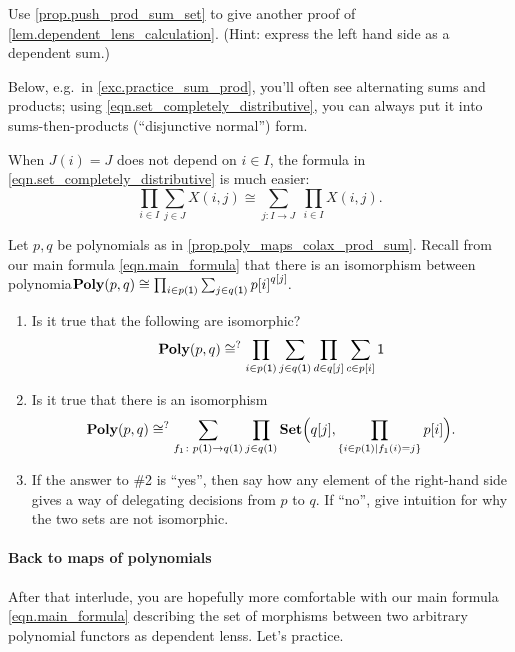 \documentclass[DynamicalBook]{subfiles}
\begin{document}
\begin{exercise}\label{ex.dependent_lens_calculation}
  Use \cref{prop.push_prod_sum_set} to give another proof of
  \cref{lem.dependent_lens_calculation}. (Hint: express the left hand side as a
  dependent sum.)
\end{exercise}

Below, e.g.\ in \cref{exc.practice_sum_prod}, you'll often see alternating sums and products; using \cref{eqn.set_completely_distributive}, you can always put it into sums-then-products (``disjunctive normal'') form.

When $J(i)=J$ does not depend on $i\in I$, the formula in \eqref{eqn.set_completely_distributive} is much easier:
\[
\prod_{i\in I}\sum_{j\in J}X(i,j)\cong\sum_{j\colon I\to J}\;\prod_{i\in I}X(i,j).
\]

\begin{exercise}\label{exc.practice_sum_prod}
Let $p,q$ be polynomials as in \cref{prop.poly_maps_colax_prod_sum}. Recall from
our main formula \eqref{eqn.main_formula} that there is an isomorphism between polynomia$\textbf{Poly}(p,q)\cong\prod_{i\in p(\textsf{1})}\sum_{j\in q(\textsf{1})}{p[i]}^{q[j]}.$ 
\begin{enumerate}
\item Is it true that the following are isomorphic?
\begin{equation}\label{eqn.poly_p_q}
  \textbf{Poly}(p,q)
  \cong^?
  \prod_{i\in p(\textsf{1})}\sum_{j\in q(\textsf{1})}\prod_{d\in q[j]}\sum_{c\in p[i]}\textsf{1}
\end{equation}
\item Is it true that there is an isomorphism
	\begin{equation}\label{eqn.useful_misc472}
	\textbf{Poly}(p,q)\cong^?\sum_{f_1\colon p(\textsf{1})\to q(\textsf{1})}\prod_{j\in q(\textsf{1})}\textbf{Set}\Big(q[j],\prod_{\{i\in p(\textsf{1})\mid f_1(i)= j\}}p[i]\Big).
	\end{equation}
\item If the answer to \#2 is ``yes'', then say how any element of the right-hand side gives a way of delegating decisions from $p$ to $q$. If ``no'', give intuition for why the two sets are not isomorphic.
\qedhere
\end{enumerate}
\end{exercise}


\paragraph{Back to maps of polynomials}
After that interlude, you are hopefully more comfortable with our main formula
\cref{eqn.main_formula} describing the set of morphisms between two arbitrary
polynomial functors as dependent lenss. Let's practice.
\end{document}
